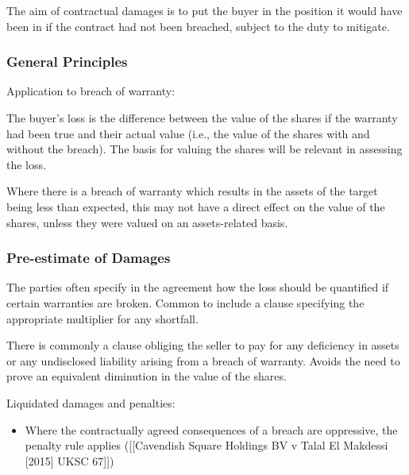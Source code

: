\documentclass[
]{article}
\newenvironment{Shaded}{}{}
\newcommand{\NormalTok}[1]{#1}
\providecommand{\tightlist}{%
  \setlength{\itemsep}{0pt}\setlength{\parskip}{0pt}}
\begin{document}
The aim of contractual damages is to put the buyer in the position it
would have been in if the contract had not been breached, subject to the
duty to mitigate.

\hypertarget{general-principles}{%
\subsubsection{General Principles}\label{general-principles}}

Application to breach of warranty:

The buyer's loss is the difference between the value of the shares if
the warranty had been true and their actual value (i.e., the value of
the shares with and without the breach). The basis for valuing the
shares will be relevant in assessing the loss.

\begin{Shaded}
\begin{Highlighting}[]
\NormalTok{Where there is a breach of warranty which results in the assets of the target being less than expected, this may not have a direct effect on the value of the shares, unless they were valued on an assets{-}related basis.}
\end{Highlighting}
\end{Shaded}

\hypertarget{pre-estimate-of-damages}{%
\subsubsection{Pre-estimate of Damages}\label{pre-estimate-of-damages}}

The parties often specify in the agreement how the loss should be
quantified if certain warranties are broken. Common to include a clause
specifying the appropriate multiplier for any shortfall.

There is commonly a clause obliging the seller to pay for any deficiency
in assets or any undisclosed liability arising from a breach of
warranty. Avoids the need to prove an equivalent diminution in the value
of the shares.

Liquidated damages and penalties:

\begin{itemize}
\tightlist
\item
  Where the contractually agreed consequences of a breach are
  oppressive, the penalty rule applies ({[}{[}Cavendish Square Holdings
  BV v Talal El Makdessi {[}2015{]} UKSC 67{]}{]})
\end{itemize}
\end{document}
